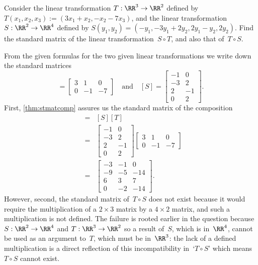 \begin{example} \label{eg:}
Consider the linear transformation \(T:\RR^3\to\RR^2\) defined by \(T(x_1,x_2,x_3):=(3x_1+x_2,-x_2-7x_3)\), and the linear transformation \(S:\RR^2\to\RR^4\) defined by \(S(y_1,y_2)=(-y_1, -3y_1+2y_2, 2y_1-y_2, 2y_2)\).
Find the standard matrix of the linear transformation~\(S\circ T\), and also that of~\(T\circ S\).
\begin{solution} 
From the given formulas for the two given linear transformations we write down the standard matrices
\begin{equation*}
[T]=\begin{bmatrix}3&1&0\\0&-1&-7  \end{bmatrix}
\quad\text{and}\quad
[S]=\begin{bmatrix} -1&0\\ -3&2\\2&-1\\0&2 \end{bmatrix}.
\end{equation*}
First, \autoref{thm:stmatcomp} assures us the standard matrix of the composition
\begin{eqnarray*}
[S\circ T]&=&[S][T]
\\&=&\begin{bmatrix} -1&0\\ -3&2\\2&-1\\0&2 \end{bmatrix}
\begin{bmatrix}3&1&0\\0&-1&-7  \end{bmatrix}
\\&=&\begin{bmatrix}-3&-1&0
\\-9&-5&-14
\\6&3&7
\\0&-2&-14 \end{bmatrix}.
\end{eqnarray*}
However, second, the standard matrix of~\(T\circ S\) does not exist because it would require the multiplication of a \(2\times3\) matrix by a \(4\times 2\) matrix, and such a multiplication is not defined.
The failure is rooted earlier in the question because \(S:\RR^2\to\RR^4\) and \(T:\RR^3\to\RR^2\) so a result of~\(S\), which is in~\(\RR^4\), cannot be used as an argument to~\(T\), which must be in~\(\RR^3\): the lack of a defined multiplication is a direct reflection of this incompatibility in~`\(T\circ S\)' which means \(T\circ S\) cannot exist.
\end{solution}
\end{example}




